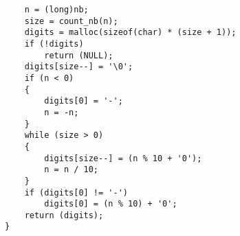 \documentclass{article}
\begin{document}
\begin{itemize}[label=$\rightarrow$]
\begin{verbatim}
    n = (long)nb;                                                               
    size = count_nb(n);                                                         
    digits = malloc(sizeof(char) * (size + 1));                                 
    if (!digits)                                                                
        return (NULL);                                                          
    digits[size--] = '\0';                                                      
    if (n < 0)                                                                  
    {                                                                           
        digits[0] = '-';                                                        
        n = -n;                                                                 
    }                                                                           
    while (size > 0)                                                            
    {                                                                           
        digits[size--] = (n % 10 + '0');                                        
        n = n / 10;                                                             
    }                                                                           
    if (digits[0] != '-')                                                       
        digits[0] = (n % 10) + '0';                                             
    return (digits);                                                            
}  
			\end{verbatim}
		\end{itemize}
	
\end{document}
